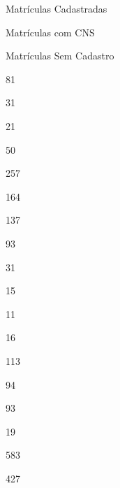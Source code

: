 \documentclass[
  letterpaper,
]{report}
\begin{document}
Matrículas Cadastradas

\n      

Matrículas com CNS

\n      

Matrículas Sem Cadastro

\n    

\n  

\n  

\n    

\n      

81

\n      

31

\n      

21

\n      

50

\n    

\n    

\n      

257

\n      

164

\n      

137

\n      

93

\n    

\n    

\n      

31

\n      

15

\n      

11

\n      

16

\n    

\n    

\n      

113

\n      

94

\n      

93

\n      

19

\n    

\n    

\n      

583

\n      

427

\n      
\end{document}
